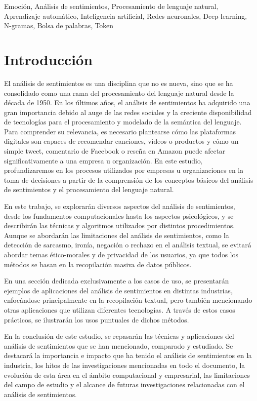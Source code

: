\documentclass[12pt, conference]{IEEEtran}
\begin{document}
\begin{IEEEkeywords}
Emoción, Análisis de sentimientos, Procesamiento de lenguaje natural, Aprendizaje automático, Inteligencia artificial, Redes neuronales, Deep learning, N-gramas, Bolsa de palabras, Token
\end{IEEEkeywords}

\section{Introducción}
El análisis de sentimientos es una disciplina que no es nueva, sino que se ha consolidado como una rama del procesamiento del lenguaje natural desde la década de 1950. 
En los últimos años, el análisis de sentimientos ha adquirido una gran importancia debido al auge de las redes sociales y la creciente disponibilidad de tecnologías para el procesamiento y modelado de la semántica del lenguaje. 
Para comprender su relevancia, es necesario plantearse cómo las plataformas digitales son capaces de recomendar canciones, vídeos o productos y cómo un simple tweet, comentario de Facebook o reseña en Amazon puede afectar significativamente a una empresa u organización. 
En este estudio, profundizaremos en los procesos utilizados por empresas u organizaciones en la toma de decisiones a partir de la comprensión de los conceptos básicos del análisis de sentimientos y el procesamiento del lenguaje natural.

En este trabajo, se explorarán diversos aspectos del análisis de sentimientos, desde los fundamentos computacionales hasta los aspectos psicológicos, y se describirán las técnicas y algoritmos utilizados por distintos procedimientos. 
Aunque se abordarán las limitaciones del análisis de sentimientos, como la detección de sarcasmo, ironía, negación o rechazo en el análisis textual, se evitará abordar temas ético-morales y de privacidad de los usuarios, ya que todos los métodos se basan en la recopilación masiva de datos públicos.

En una sección dedicada exclusivamente a los casos de uso, se presentarán ejemplos de aplicaciones del análisis de sentimientos en distintas industrias, enfocándose principalmente en la recopilación textual, pero también mencionando otras aplicaciones que utilizan diferentes tecnologías. 
A través de estos casos prácticos, se ilustrarán los usos puntuales de dichos métodos.

En la conclusión de este estudio, se repasarán las técnicas y aplicaciones del análisis de sentimientos que se han mencionado, comparado y estudiado. 
Se destacará la importancia e impacto que ha tenido el análisis de sentimientos en la industria, los hitos de las investigaciones mencionadas en todo el documento, la evolución de esta área en el ámbito computacional y empresarial, las limitaciones del campo de estudio y el alcance de futuras investigaciones relacionadas con el análisis de sentimientos.
\end{document}
